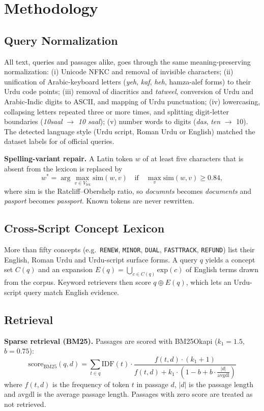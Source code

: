 \documentclass[12pt,a4paper]{article}
\begin{document}
\section{Methodology}

\subsection{Query Normalization}
All text, queries and passages alike, goes through the same meaning-preserving normalization:
(i) Unicode NFKC and removal of invisible characters; (ii) unification of Arabic-keyboard letters
(\textit{yeh}, \textit{kaf}, \textit{heh}, hamza-alef forms) to their Urdu code points; (iii) removal of diacritics and
\textit{tatweel}, conversion of Urdu and Arabic-Indic digits to ASCII, and mapping of Urdu punctuation;
(iv) lowercasing, collapsing letters repeated three or more times, and splitting digit-letter boundaries
(\textit{10saal} $\to$ \textit{10 saal}); (v) number words to digits (\textit{das}, \textit{ten} $\to$ 10).
The detected language style (Urdu script, Roman Urdu or English) matched the dataset labels for \RStyleAcc{} of official
queries.

\textbf{Spelling-variant repair.} A Latin token $w$ of at least five characters that is absent from the lexicon is replaced by
\begin{equation}
w^\ast = \arg\max_{v \in V_{\text{lex}}} \text{sim}(w, v) \quad \text{if} \quad \max_{v} \text{sim}(w, v) \geq 0.84,
\end{equation}
where $\text{sim}$ is the Ratcliff--Obershelp ratio, so \textit{documnts} becomes \textit{documents} and \textit{pasport}
becomes \textit{passport}. Known tokens are never rewritten.

\subsection{Cross-Script Concept Lexicon}
More than fifty concepts (e.g.\ \texttt{RENEW}, \texttt{MINOR}, \texttt{DUAL}, \texttt{FASTTRACK}, \texttt{REFUND}) list
their English, Roman Urdu and Urdu-script surface forms. A query $q$ yields a concept set $C(q)$ and an expansion
$E(q)=\bigcup_{c\in C(q)} \text{exp}(c)$ of English terms drawn from the corpus. Keyword retrievers then score
$q \oplus E(q)$, which lets an Urdu-script query match English evidence.

\subsection{Retrieval}
\textbf{Sparse retrieval (BM25).} Passages are scored with BM25Okapi ($k_1=1.5$, $b=0.75$):
\begin{equation}
\text{score}_{\text{BM25}}(q, d) = \sum_{t \in q} \text{IDF}(t) \cdot
\frac{f(t,d) \cdot (k_1+1)}{f(t,d) + k_1 \cdot \left(1 - b + b \cdot \frac{|d|}{\text{avgdl}}\right)}
\end{equation}
where $f(t,d)$ is the frequency of token $t$ in passage $d$, $|d|$ is the passage length and avgdl is the average passage
length. Passages with zero score are treated as not retrieved.
\end{document}
